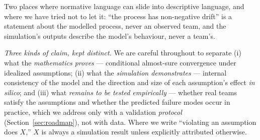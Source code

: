 \documentclass[11pt]{article}
\begin{document}
Two places where normative language can slide into descriptive language, and where we have tried not to let it: ``the process has non-negative drift'' is a statement about the modelled process, never an observed team, and the simulation's outputs describe the model's behaviour, never a team's.

\emph{Three kinds of claim, kept distinct.} We are careful throughout to separate (i) what the \emph{mathematics proves} --- conditional almost-sure convergence under idealized assumptions; (ii) what the \emph{simulation demonstrates} --- internal consistency of the model and the direction and size of each assumption's effect \emph{in silico}; and (iii) what \emph{remains to be tested empirically} --- whether real teams satisfy the assumptions and whether the predicted failure modes occur in practice, which we address only with a validation \emph{protocol} (Section~\ref{sec:roadmap}), not with data. Where we write ``violating an assumption does $X$,'' $X$ is always a simulation result unless explicitly attributed otherwise.
\end{document}
